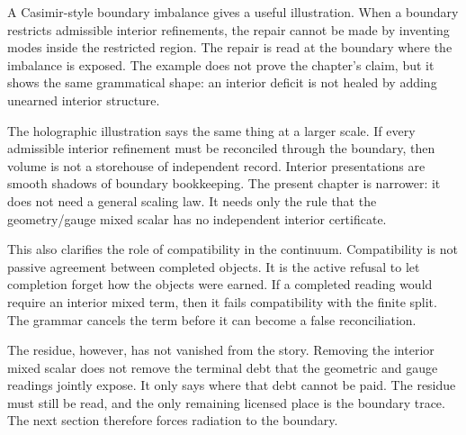 A Casimir-style boundary imbalance gives a useful illustration. When a
boundary restricts admissible interior refinements, the repair cannot be
made by inventing modes inside the restricted region. The repair is read at
the boundary where the imbalance is exposed. The example does not prove the
chapter's claim, but it shows the same grammatical shape: an interior
deficit is not healed by adding unearned interior structure.

The holographic illustration says the same thing at a larger scale. If every
admissible interior refinement must be reconciled through the boundary, then
volume is not a storehouse of independent record. Interior presentations are
smooth shadows of boundary bookkeeping. The present chapter is narrower: it
does not need a general scaling law. It needs only the rule that the
geometry/gauge mixed scalar has no independent interior certificate.

This also clarifies the role of compatibility in the continuum. Compatibility
is not passive agreement between completed objects. It is the active refusal
to let completion forget how the objects were earned. If a completed reading
would require an interior mixed term, then it fails compatibility with the
finite split. The grammar cancels the term before it can become a false
reconciliation.

The residue, however, has not vanished from the story. Removing the interior
mixed scalar does not remove the terminal debt that the geometric and gauge
readings jointly expose. It only says where that debt cannot be paid. The
residue must still be read, and the only remaining licensed place is the
boundary trace. The next section therefore forces radiation to the boundary.
